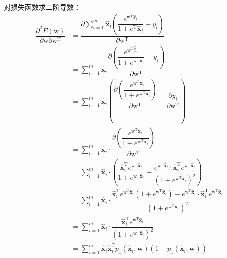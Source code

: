 \documentclass{article}
\begin{document}
对损失函数求二阶导数：
\begin{equation*}
    \begin{aligned}
        \dfrac{\partial^2 E(\mathrm{w})}{\partial \mathrm{w} \partial \mathrm{w}^{\mathrm{T}}} & =\dfrac{\partial \sum_{i=1}^m \hat{\boldsymbol{x}}_i\left(\dfrac{e^{\mathrm{w}^{\mathrm{T}} \hat{x}_i}}{1+e^{\mathrm{T}} \hat{\boldsymbol{x}}_i}-y_i\right)}{\partial \mathrm{w}^{\mathrm{T}}} \\
        & =\sum_{i=1}^m \hat{\boldsymbol{x}}_i \dfrac{\partial\left(\dfrac{e^{\mathrm{w}^{\mathrm{T}} \hat{\hat{x}}_i}}{1+e^{\mathrm{w}^{\mathrm{T}} \hat{\boldsymbol{x}}_i}}-y_i\right)}{\partial \mathrm{w}^{\mathrm{T}}} \\
        & =\sum_{i=1}^m \hat{\boldsymbol{x}}_i\left(\dfrac{\partial\left(\dfrac{e^{\mathrm{w}^{\mathrm{T}} \hat{\boldsymbol{x}}_i}}{1+e^{\mathrm{w}^{\mathrm{T}} \hat{\boldsymbol{x}}_i}}\right)}{\partial \mathrm{w}^{\mathrm{T}}}-\dfrac{\partial y_i}{\partial \mathrm{w}^{\mathrm{T}}}\right) \\
        & =\sum_{i=1}^m \hat{\boldsymbol{x}}_i \cdot \dfrac{\partial\left(\dfrac{e^{\mathrm{w}^{\mathrm{T}} \hat{\boldsymbol{x}}_i}}{1+e^{\mathrm{w}^{\mathrm{T}} \hat{\boldsymbol{x}}_i}}\right)}{\partial \mathrm{w}^{\mathrm{T}}}\\
        & =\sum_{i=1}^m \hat{\boldsymbol{x}}_i\cdot\left(\dfrac{\hat{\boldsymbol{x}}_i^{\mathrm{T}}e^{\mathrm{w}^{\mathrm{T}} \hat{\boldsymbol{x}}_i}}{1+e^{\mathrm{w}^{\mathrm{T}} \hat{\boldsymbol{x}}_i}} - \dfrac{e^{\mathrm{w}^{\mathrm{T}} \hat{\boldsymbol{x}}_i} \cdot \hat{\boldsymbol{x}}_i^{\mathrm{T}}e^{\mathrm{w}^{\mathrm{T}} \hat{\boldsymbol{x}}_i}}{\left(1+e^{\mathrm{w}^{\mathrm{T}} \hat{\boldsymbol{x}}_i}\right)^2} \right)\\
        & =\sum_{i=1}^m \hat{\boldsymbol{x}}_i\cdot \dfrac{\hat{\boldsymbol{x}}_i^{\mathrm{T}}e^{\mathrm{w}^{\mathrm{T}} \hat{\boldsymbol{x}}_i}\left(1+e^{\mathrm{w}^{\mathrm{T}} \hat{\boldsymbol{x}}_i}\right) - e^{\mathrm{w}^{\mathrm{T}} \hat{\boldsymbol{x}}_i} \cdot \hat{\boldsymbol{x}}_i^{\mathrm{T}}e^{\mathrm{w}^{\mathrm{T}} \hat{\boldsymbol{x}}_i}}{\left(1+e^{\mathrm{w}^{\mathrm{T}} \hat{\boldsymbol{x}}_i}\right)^2} \\
        & =\sum_{i=1}^m \hat{\boldsymbol{x}}_i\cdot \dfrac{\hat{\boldsymbol{x}}_i^{\mathrm{T}}e^{\mathrm{w}^{\mathrm{T}} \hat{\boldsymbol{x}}_i}}{\left(1+e^{\mathrm{w}^{\mathrm{T}} \hat{\boldsymbol{x}}_i}\right)^2} \\
        & = \sum_{i=1}^m \hat{\boldsymbol{x}}_i \hat{\boldsymbol{x}}_i^{\mathrm{T}}p_1\left(\hat{\boldsymbol{x}}_i ; \mathbf{w}\right)\left(1-p_1\left(\hat{\boldsymbol{x}}_i ; \mathbf{w}\right)\right)
    \end{aligned}
\end{equation*}
\end{document}
